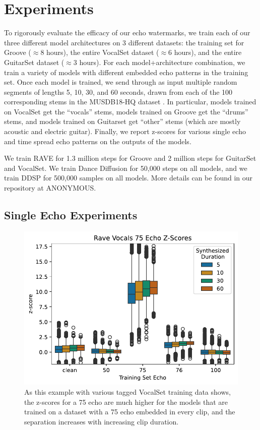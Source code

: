 \documentclass[letterpaper]{article} %
\begin{document}
\section{Experiments}

To rigorously evaluate the efficacy of our echo watermarks, we train each of our three different model architectures on 3 different datasets:  the training set for Groove \cite{groove2019} ($\approx$8 hours), the entire VocalSet dataset \cite{wilkins2018vocalset} ($\approx$6 hours), and the entire GuitarSet dataset \cite{xi2018guitarset} ($\approx$3 hours).  For each model+architecture combination, we train a variety of models with different embedded echo patterns in the training set.  Once each model is trained, we send through as input multiple random segments of lengths 5, 10, 30, and 60 seconds, drawn from each of the 100 corresponding stems in the MUSDB18-HQ dataset \cite{musdb18-hq}.  In particular, models trained on VocalSet get the ``vocals'' stems, models trained on Groove get the ``drums'' stems, and models trained on Guitarset get ``other'' stems (which are mostly acoustic and electric guitar).  Finally, we report z-scores for various single echo and time spread echo patterns on the outputs of the models.

We train RAVE for 1.3 million steps for Groove and 2 million steps for GuitarSet and VocalSet.  We train Dance Diffusion for 50,000 steps on all models, and we train DDSP for 500,000 samples on all models.  More details can be found in our repository at ANONYMOUS.

\subsection{Single Echo Experiments}
\label{sec:experimentssingleecho}


\begin{figure}
    \centering
    \includegraphics[width=\columnwidth]{figs/RaveZScoreExamples.pdf}
    \caption{As this example with various tagged VocalSet training data shows, the z-scores for a 75 echo are much higher for the models that are trained on a dataset with a 75 echo embedded in every clip, and the separation increases with increasing clip duration.}
    \label{fig:ravezscoreexamples}
\end{figure}
\end{document}
